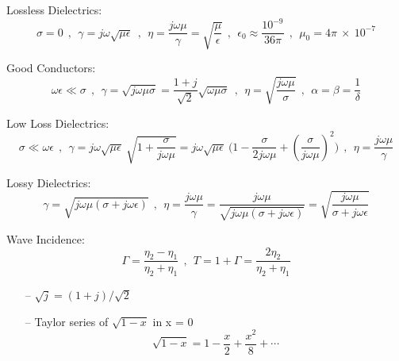 Lossless Dielectrics:
$$ \sigma = 0 ~~ , ~~ \gamma = j \omega \sqrt{\mu \epsilon} ~~ , ~~ \eta = \frac{j \omega \mu}{\gamma} = \sqrt{\frac{\mu}{\epsilon}} ~~ , ~~ {\epsilon}_0 \approx \frac{10^{-9}}{36 \pi} ~~ , ~~ {\mu}_0 = 4 \pi ~ \times ~ 10 ^{-7}$$
\par
Good Conductors:
$$ \omega \epsilon \ll \sigma ~~ , ~~ \gamma = \sqrt{j \omega \mu \sigma } =\frac{1+j}{\sqrt{2}} \sqrt{\omega \mu \sigma}~~ , ~~ \eta = \sqrt{\frac{j \omega \mu}{\sigma}} ~~ , ~~ \alpha = \beta = \frac{1}{\delta}$$
\par
Low Loss Dielectrics: 
$$ \sigma \ll \omega \epsilon ~~ , ~~ \gamma = j \omega \sqrt{\mu \epsilon}~\sqrt{1+\frac{\sigma}{j \omega \mu}} = j \omega \sqrt{\mu \epsilon}~\Big(1 - \frac{\sigma}{2 j \omega \mu} + (\frac{\sigma}{j \omega \mu})^2\Big)~~ , ~~ \eta = \frac{j \omega \mu}{\gamma} $$
\par
Lossy Dielectrics: 
$$  \gamma = \sqrt{j \omega \mu (\sigma + j \omega \epsilon)}~~ , ~~ \eta = \frac{j \omega \mu}{\gamma} = \frac{j \omega \mu}{\sqrt{j \omega \mu (\sigma + j \omega \epsilon)}} = \sqrt{\frac{j \omega \mu}{\sigma + j \omega \epsilon}} $$
\par
Wave Incidence: 
$$  \Gamma = \frac{{\eta}_2 - {\eta}_1}{{\eta}_2 +{\eta}_1} ~~ , ~~ T = 1 + \Gamma = \frac{2 {\eta}_2}{{\eta}_2 + {\eta}_1}$$
\setlength{\parindent}{0.0cm} %
\par
\begin{itemize}
\item[--] $\sqrt{j} = (1+j)/\sqrt{2}$
\item[--] Taylor series of $\sqrt{1-x}$ in x = 0
$$ \sqrt{1-x} = 1 - \frac{x}{2} + \frac{x^2}{8} + \cdots $$
\end{itemize}
